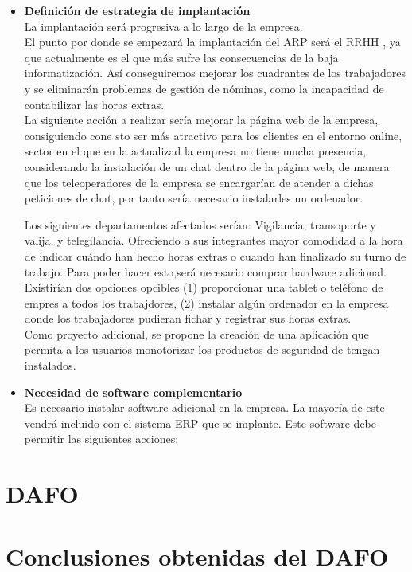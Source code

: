 \documentclass[12pt,letterpaper]{article}
\begin{document}
\begin{itemize}
	  \item \textbf{Definición de estrategia de implantación}\\
	  La implantación será progresiva a lo largo de la empresa.\\ El punto por donde se empezará la implantación del ARP será el RRHH , ya que actualmente es el que más sufre las consecuencias de la baja informatización. Así conseguiremos mejorar los cuadrantes de los trabajadores y se eliminarán problemas de gestión de nóminas, como la incapacidad de contabilizar las horas extras.\\ La siguiente acción a realizar sería mejorar la página web de la empresa, consiguiendo cone sto ser más atractivo para los clientes en el entorno online, sector en el que en la actualizad la empresa  no tiene mucha presencia, considerando la instalación de un chat dentro de la página web, de manera que los teleoperadores de la empresa se encargarían de atender a dichas peticiones de chat, por tanto sería necesario instalarles un ordenador.
	  
	  Los siguientes departamentos afectados serían: Vigilancia, transoporte y valija, y telegilancia. Ofreciendo a sus integrantes mayor comodidad a la hora de indicar cuándo han hecho horas extras o cuando han finalizado su turno de trabajo. Para poder hacer esto,será necesario comprar hardware adicional. Existirían dos opciones opcibles (1) proporcionar una tablet o teléfono de empres a todos los trabajdores, (2) instalar algún ordenador en la empresa donde los trabajadores pudieran fichar y registrar sus  horas extras.\\ Como proyecto adicional, se propone la creación de una aplicación que permita a los usuarios monotorizar los productos de seguridad de tengan instalados.
	  
	  \item \textbf{Necesidad de software complementario}\\
	  Es necesario instalar software adicional en la empresa. La mayoría de este vendrá incluido con el sistema ERP que se implante. Este software debe permitir las siguientes acciones:
	  
		
	  \end{itemize} 
	
	\section{DAFO}
	
	\section{Conclusiones obtenidas del DAFO}
\end{document}
